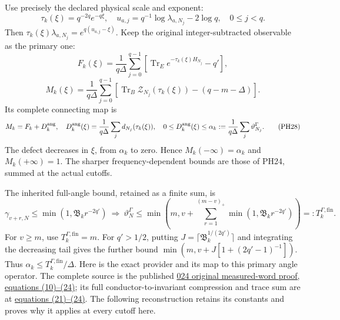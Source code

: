 \documentclass[10pt]{article}
\begin{document}
Use precisely the declared physical scale and exponent: \[
 \tau_k(\xi)=q^{-2q}e^{-q\xi},\quad
 u_{a,j}=q^{-1}\log\lambda_{a,N_j}-2\log q,\quad 0\le j<q.
 \tag{PH26}
\] Then \(\tau_k(\xi)\lambda_{a,N_j}=e^{q(u_{a,j}-\xi)}\). Keep the original integer-subtracted observable as the primary one: \[
 F_k(\xi)=\frac1{q\Delta}\sum_{j=0}^{q-1}
 [\operatorname{Tr}_E e^{-\tau_k(\xi)H_{N_j}}-q'],
\] \[
 M_k(\xi)=\frac1{q\Delta}\sum_{j=0}^{q-1}
 [\operatorname{Tr}_B\mathscr Z_{N_j}(\tau_k(\xi))-(q-m-\Delta)].
 \tag{PH27}
\] Its complete connecting map is \[
 M_k=F_k+D_k^{\rm ang},\quad
 D_k^{\rm ang}(\xi)=\frac1{q\Delta}\sum_jd_{N_j}(\tau_k(\xi)),
 \quad0\le D_k^{\rm ang}(\xi)\le
 \alpha_k:=\frac1{q\Delta}\sum_j\vartheta_{N_j}^\Gamma .
 \tag{PH28}
\] The defect decreases in \(\xi\), from \(\alpha_k\) to zero. Hence \(M_k(-\infty)=\alpha_k\) and \(M_k(+\infty)=1\). The sharper frequency-dependent bounds are those of PH24, summed at the actual cutoffs.

The inherited full-angle bound, retained as a finite sum, is \[
 \gamma_{v+r,N}\le\min(1,\mathfrak B_kr^{-2q'})
 \ \Longrightarrow\
 \vartheta_N^\Gamma\le
 \min\!\left(m,v+\sum_{r=1}^{(m-v)_+}\min(1,\mathfrak B_kr^{-2q'})\right)
 =:T_k^{\Gamma,\mathrm{fin}}.
 \tag{PH29}
\] For \(v\ge m\), use \(T_k^{\Gamma,\mathrm{fin}}=m\). For \(q'>1/2\), putting \(J=\lceil\mathfrak B_k^{1/(2q')}\rceil\) and integrating the decreasing tail gives the further bound \(\min(m,v+J[1+(2q'-1)^{-1}])\). Thus \(\alpha_k\le T_k^{\Gamma,\mathrm{fin}}/\Delta\). Here is the exact provider and its map to this primary angle operator. The complete source is the published \href{https://github.com/KokunoYumeto/zeta-function-research-reader/blob/1447462732b40b1474bd9a819cf79257f5326ada/workbenches/splitzero-tandem/continuations/20260922-kernel-frequency/RETAINED_COMPLETE_PROOF_SOURCES.tex\#L348274}{024 original measured-word proof, equations (10)--(24)}; its full conductor-to-invariant compression and trace sum are at \href{https://github.com/KokunoYumeto/zeta-function-research-reader/blob/1447462732b40b1474bd9a819cf79257f5326ada/workbenches/splitzero-tandem/continuations/20260922-kernel-frequency/RETAINED_COMPLETE_PROOF_SOURCES.tex\#L348677}{equations (21)--(24)}. The following reconstruction retains its constants and proves why it applies at every cutoff here.
\end{document}
